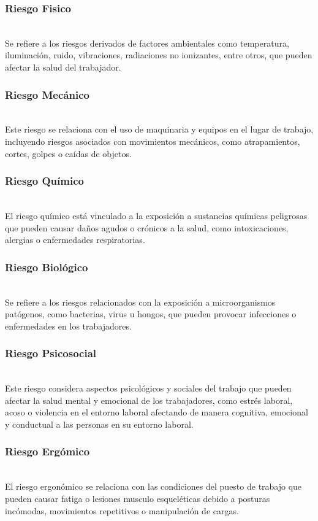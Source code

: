 \subsubsection{Riesgo Fisico}\hfill\\
\indent
Se refiere a los riesgos derivados de factores ambientales como temperatura, iluminación, ruido, vibraciones, radiaciones no ionizantes, entre otros, que pueden afectar la salud del trabajador.

\subsubsection{Riesgo Mecánico}\hfill\\
\indent
Este riesgo se relaciona con el uso de maquinaria y equipos en el lugar de trabajo, incluyendo riesgos asociados con movimientos mecánicos, como atrapamientos, cortes, golpes o caídas de objetos.

\subsubsection{Riesgo Químico}\hfill\\
\indent
El riesgo químico está vinculado a la exposición a sustancias químicas peligrosas que pueden causar daños agudos o crónicos a la salud, como intoxicaciones, alergias o enfermedades respiratorias.

\subsubsection{Riesgo Biológico}\hfill\\
\indent
Se refiere a los riesgos relacionados con la exposición a microorganismos patógenos, como bacterias, virus u hongos, que pueden provocar infecciones o enfermedades en los trabajadores.

\subsubsection{Riesgo Psicosocial}\hfill\\
\indent
Este riesgo considera aspectos psicológicos y sociales del trabajo que pueden afectar la salud mental y emocional de los trabajadores, como estrés laboral, acoso o violencia en el entorno laboral afectando de manera cognitiva, emocional y conductual a las personas en su entorno laboral.

\subsubsection{Riesgo Ergómico}\hfill\\
\indent
El riesgo ergonómico se relaciona con las condiciones del puesto de trabajo que pueden causar fatiga o lesiones musculo esqueléticas debido a posturas incómodas, movimientos repetitivos o manipulación de cargas.

